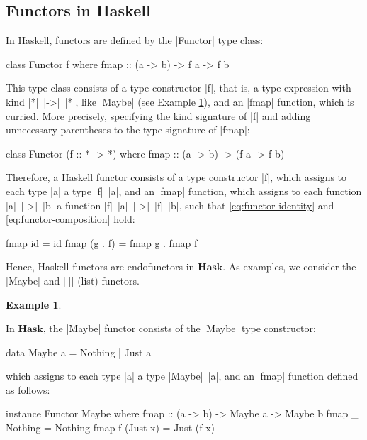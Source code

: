 \documentclass[11pt,letterpaper]{article}
\theoremstyle{definition}
\newtheorem{example}{Example}[section]
\newcommand{\catbf}[1]{\ensuremath{\mathbf{#1}}\xspace}
\newcommand{\hask}{\catbf{Hask}}
\begin{document}
\subsection{Functors in Haskell}
\label{sec:functors-haskell}

In Haskell, functors are defined by the |Functor| type class:
\begin{code}
class Functor f where
  fmap :: (a -> b) -> f a -> f b
\end{code}
This type class consists of a type constructor |f|, that is, a type
expression with kind |*|~|->|~|*|, like |Maybe| (see Example
\ref{ex:functor-maybe}), and an |fmap| function, which is curried.
More precisely, specifying the kind signature of |f| and adding
unnecessary parentheses to the type signature of |fmap|:
\begin{code}
class Functor (f :: * -> *) where
  fmap :: (a -> b) -> (f a -> f b)
\end{code}

Therefore, a Haskell functor consists of a type constructor |f|, which
assigns to each type |a| a type |f|~|a|, and an |fmap| function, which
assigns to each function |a|~|->|~|b| a function |f|~|a|~|->|~|f|~|b|,
such that \eqref{eq:functor-identity} and
\eqref{eq:functor-composition} hold:
\begin{code}
fmap id      = id
fmap (g . f) = fmap g . fmap f
\end{code}

Hence, Haskell functors are endofunctors in \hask. As examples, we
consider the |Maybe| and |[]| (list) functors.

\begin{example}
  \label{ex:functor-maybe}


  In \hask, the |Maybe| functor consists of the |Maybe| type
  constructor:
  \begin{code}
data Maybe a = Nothing | Just a
  \end{code}
  which assigns to each type |a| a type |Maybe|~|a|, and an |fmap|
  function defined as follows:
  \begin{code}
instance Functor Maybe where
  fmap :: (a -> b) -> Maybe a -> Maybe b
  fmap _ Nothing  = Nothing
  fmap f (Just x) = Just (f x)
  \end{code}

\end{example}
\end{document}
